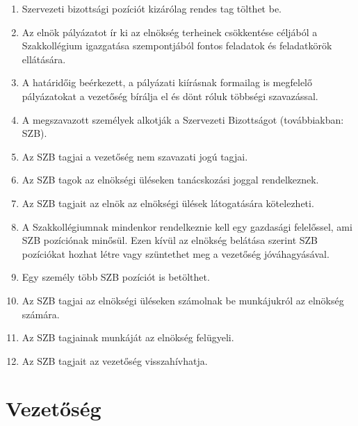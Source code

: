 \documentclass[12pt]{report}
\begin{document}
\begin{enumerate}
  \item Szervezeti bizottsági pozíciót kizárólag rendes tag tölthet be.
  \item Az elnök pályázatot ír ki az elnökség terheinek csökkentése céljából a Szakkollégium igazgatása szempontjából fontos feladatok és feladatkörök ellátására.
  \item A határidőig beérkezett, a pályázati kiírásnak formailag is megfelelő pályázatokat a vezetőség bírálja el és dönt róluk többségi szavazással.
  \item A megszavazott személyek alkotják a Szervezeti Bizottságot (továbbiakban: SZB).
  \item Az SZB tagjai a vezetőség nem szavazati jogú tagjai.
  \item Az SZB tagok az elnökségi üléseken tanácskozási joggal rendelkeznek.
  \item Az SZB tagjait az elnök az elnökségi ülések látogatására kötelezheti.
  \item A Szakkollégiumnak mindenkor rendelkeznie kell egy gazdasági felelőssel, ami SZB pozíciónak minősül. Ezen kívül az elnökség belátása szerint SZB pozíciókat hozhat létre 
    vagy szüntethet meg a vezetőség jóváhagyásával.
  \item Egy személy több SZB pozíciót is betölthet. 
  \item Az SZB tagjai az elnökségi üléseken számolnak be munkájukról az elnökség számára.
  \item Az SZB tagjainak munkáját az elnökség felügyeli.
  \item Az SZB tagjait az vezetőség visszahívhatja.  
\end{enumerate}


\section{Vezetőség} \label{sec_leadership}
\end{document}
